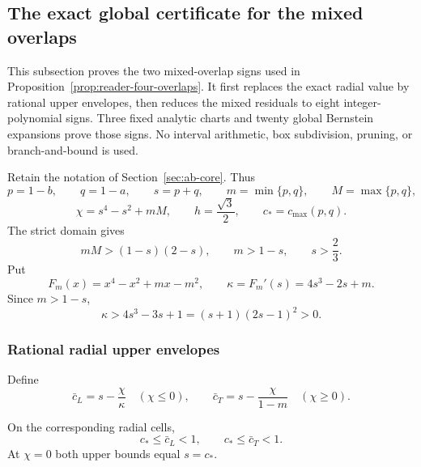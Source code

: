 \subsection{The exact global certificate for the mixed overlaps}
\label{subsec:exact-mixed-overlap}

This subsection proves the two mixed-overlap signs used in
Proposition~\ref{prop:reader-four-overlaps}.  It first
replaces the exact radial value by rational upper envelopes, then reduces the
mixed residuals to eight integer-polynomial signs.  Three fixed analytic charts
and twenty global Bernstein expansions prove those signs.  No interval
arithmetic, box subdivision, pruning, or branch-and-bound is used.

Retain the notation of Section~\ref{sec:ab-core}.  Thus
\[
 p=1-b,\qquad q=1-a,\qquad
 s=p+q,\qquad m=\min\{p,q\},\qquad M=\max\{p,q\},
\]
\[
 \chi=s^4-s^2+mM,\qquad h=\frac{\sqrt3}{2},
 \qquad c_*=c_{\max}(p,q).
\]
The strict domain gives
\begin{equation}
 mM>(1-s)(2-s),\qquad m>1-s,\qquad s>\frac23.
 \label{eq:global-mixed-domain}
\end{equation}
Put
\[
 F_m(x)=x^4-x^2+mx-m^2,
 \qquad \kappa=F_m'(s)=4s^3-2s+m.
\]
Since $m>1-s$,
\begin{equation}
 \kappa>4s^3-3s+1=(s+1)(2s-1)^2>0.
 \label{eq:global-kappa-positive}
\end{equation}

\subsubsection{Rational radial upper envelopes}

Define
\begin{equation}
 \bar c_L=s-\frac{\chi}{\kappa}\quad(\chi\le0),
 \qquad
 \bar c_T=s-\frac{\chi}{1-m}\quad(\chi\ge0).
 \label{eq:global-branchwise-cbar}
\end{equation}

\begin{lemma}
\label{lem:global-branchwise-cbar}
On the corresponding radial cells,
\[
 c_*\le\bar c_L<1,\qquad c_*\le\bar c_T<1.
\]
At $\chi=0$ both upper bounds equal $s=c_*$.
\end{lemma}

